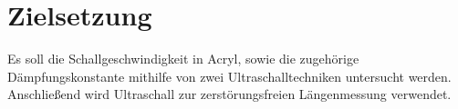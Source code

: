 
\section{Zielsetzung}
\label{sec:Zielsetzung}
Es soll die Schallgeschwindigkeit in Acryl, sowie die zugehörige Dämpfungskonstante mithilfe von zwei Ultraschalltechniken untersucht werden.
 Anschließend wird Ultraschall zur zerstörungsfreien Längenmessung verwendet.
